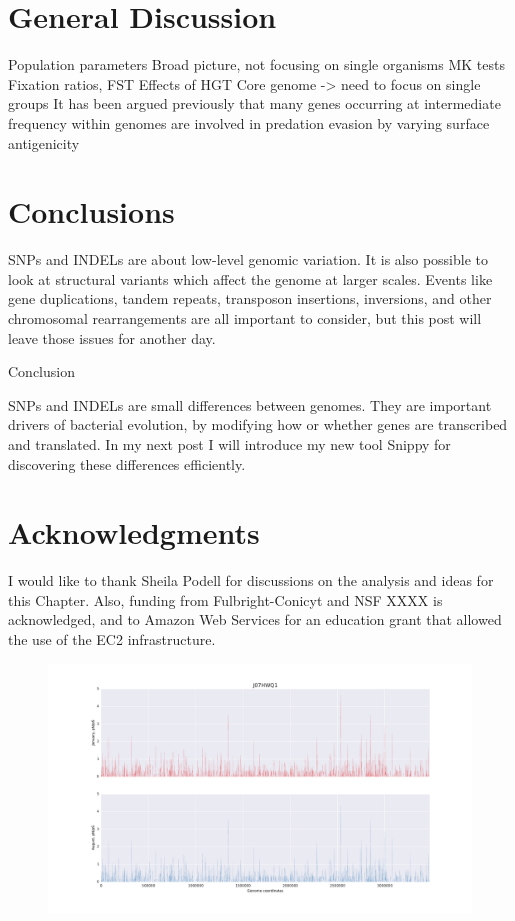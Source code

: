 
\clearpage
\section{General Discussion}
Population parameters
Broad picture, not focusing on single organisms
MK tests
Fixation ratios, FST
Effects of HGT
Core genome -> need to focus on single groups
It has been argued previously that many genes occurring at intermediate frequency within genomes are involved in predation evasion by varying surface antigenicity 


\section{Conclusions}

SNPs and INDELs are about low-level genomic variation. It is also possible to look at structural variants which affect the genome at larger scales. Events like gene duplications, tandem repeats, transposon insertions, inversions, and other chromosomal rearrangements are all important to consider, but this post will leave those issues for another day.

Conclusion

SNPs and INDELs are small differences between genomes. They are important drivers of bacterial evolution, by modifying how or whether genes are transcribed and translated. In my next post I will introduce my new tool Snippy for discovering these differences efficiently.

\section{Acknowledgments}
I would like to thank Sheila Podell for discussions on the analysis and ideas for this Chapter. Also, funding from Fulbright-Conicyt and NSF XXXX is acknowledged, and to Amazon Web Services for an education grant that allowed the use of the EC2 infrastructure.


\begin{figure}[p]
  \centering
  \includegraphics[width=\textwidth,height=\textheight,keepaspectratio]{Chapter5/Figures/pn_ps_plots/J07HWQ1_pNpS_density.pdf}
  \caption{}
  \label{J07HWQ1_pNpS}
\end{figure}

